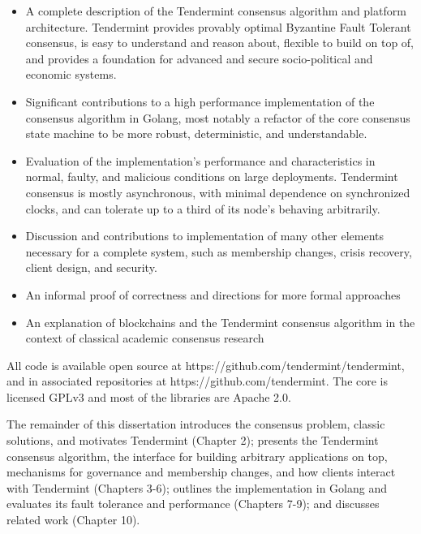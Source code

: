 \begin{itemize}  

    \item A complete description of the Tendermint consensus algorithm and platform architecture. Tendermint provides provably optimal Byzantine Fault Tolerant consensus, is easy to understand and reason about, flexible to build on top of, and provides a foundation for advanced and secure socio-political and economic systems. 

    \item Significant contributions to a high performance implementation of the consensus algorithm in Golang, most notably a refactor of the core consensus state machine to be more robust, deterministic, and understandable.

    \item Evaluation of the implementation's performance and characteristics in normal, faulty, and malicious conditions on large deployments. Tendermint consensus is mostly asynchronous, with minimal dependence on synchronized clocks, and can tolerate up to a third of its node's behaving arbitrarily. 

    \item Discussion and contributions to implementation of many other elements necessary for a complete system, such as membership changes, crisis recovery, client design, and security.

    \item An informal proof of correctness and directions for more formal approaches

    \item An explanation of blockchains and the Tendermint consensus algorithm in the context of classical academic consensus research 
\end{itemize}

All code is available open source at https://github.com/tendermint/tendermint, and in associated repositories at https://github.com/tendermint. 
The core is licensed GPLv3 and most of the libraries are Apache 2.0.

The remainder of this dissertation introduces the consensus problem, classic solutions, and motivates Tendermint (Chapter 2);
presents the Tendermint consensus algorithm, the interface for building arbitrary applications on top, mechanisms for governance and membership changes, 
and how clients interact with Tendermint (Chapters 3-6); 
outlines the implementation in Golang and evaluates its fault tolerance and performance (Chapters 7-9);
and discusses related work (Chapter 10).
